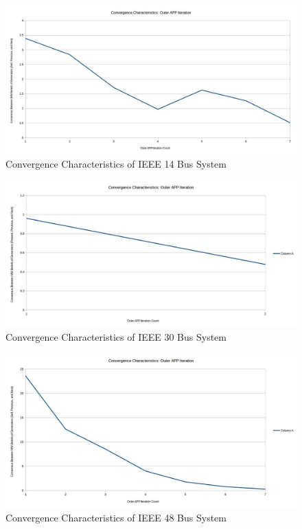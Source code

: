 \documentclass[preprint,12pt,3p]{elsarticle}
\begin{document}
\begin{figure}
\begin{center}
\includegraphics[width=0.92\linewidth,trim=5mm 12mm 5mm 5mm, clip]{N_1_SCOPF_14_Bus.jpg}
\caption{Convergence Characteristics of IEEE 14 Bus System}
\label{14Conv}
\end{center}
\end{figure}
\begin{figure}
\begin{center}
\includegraphics[width=0.92\linewidth,trim=5mm 12mm 5mm 5mm, clip]{N-1_SCOPF_30_Bus.jpg}
\caption{Convergence Characteristics of IEEE 30 Bus System}
\label{30Conv}
\end{center}
\end{figure}
\begin{figure}
\begin{center}
\includegraphics[width=0.92\linewidth,trim=5mm 12mm 5mm 5mm, clip]{N-1_SCOPF_48_Bus.jpg}
\caption{Convergence Characteristics of IEEE 48 Bus System}
\label{48Conv}
\end{center}
\end{figure}
\end{document}

